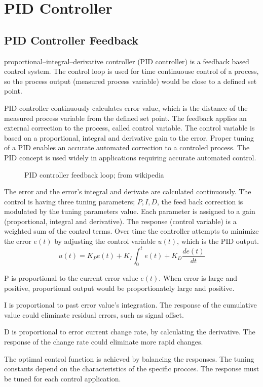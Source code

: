 \documentclass[\main/master.tex]{subfiles}
\begin{document}
\section{PID Controller}
\subsection{PID Controller Feedback}
proportional–integral–derivative controller (PID controller) is a feedback based control system. The control loop is used for time continuouse control of a process, so the process output (measured process variable) would be close to a defined set point.
\par
PID controller continuously calculates error value, which is the distance of the measured process variable from the defined set point. The feedback applies an external correction to the process, called control variable. The control variable is based on a proportional, integral and derivative gain to the error. Proper tuning of a PID enables an accurate automated correction to a controled process. The PID concept is used widely in applications requiring accurate automated control.
\par
\begin{figure}[htbp]
	\centering
	\caption[PID]{PID controller feedback loop; from wikipedia}
	\label{fig:PID_scheme}
\end{figure}


\par
The error and the error's integral and derivate are calculated continuously. The control is having three tuning parameters; $P, I, D$, the feed back correction is modulated by the tuning parameters value. Each parameter is assigned to a gain (proportional, integral and derivative). The response (control variable) is a weighted sum of the control terms. Over time the controller attempts to minimize the error $e(t)$ by adjusting the control variable $u(t)$, which is the PID output.
\begin{equation}
u(t) = K_Pe(t)+K_I\int_{0}^{t}e(t)+K_D\frac{de(t)}{dt}   \label{eqn:PID_eq}
\end{equation}


P is proportional to the current error value $e(t)$. When error is large and positive, proportional output would be proportionately large and positive.
\par
I is proportional to past error value's integration. The response of the cumulative value could eliminate residual errors, such as signal offset.
\par
D is proportional to error current change rate, by calculating the derivative. The response of the change rate could eliminate more rapid changes.
\par
The optimal control function is achieved by balancing the responses. The tuning constants depend on the characteristics of the specific procces. The response must be tuned for each control application.  
\end{document}
